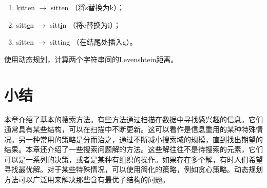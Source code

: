 \documentclass[UTF8]{article}
\begin{document}
\begin{Exercise}
\begin{itemize}
  \begin{enumerate}
  \item \underline{k}itten $\rightarrow$ \underline{s}itten （将s替换为k）；
  \item sitt\underline{e}n $\rightarrow$ sitt\underline{i}n （将e替换为i）；
  \item sitten $\rightarrow$ sittin\underline{g} （在结尾处插入g）。
  \end{enumerate}
使用动态规划，计算两个字符串间的Levenshtein距离。
\end{itemize}
\end{Exercise}

\section{小结}

本章介绍了基本的搜索方法。有些方法通过扫描在数据中寻找感兴趣的信息。它们通常具有某些结构，可以在扫描中不断更新。这可以看作是信息重用的某种特殊情况。另一种常用的策略是分而治之，通过不断减小搜索域的规模，直到找出期望的结果。本章还介绍了一些搜索问题解的方法。这些解往往不是待搜索的元素，它们可以是一系列的决策，或者是某种有组织的操作。如果存在多个解，有时人们希望寻找最优解。对于某些特殊情况，可以使用简化的策略，例如贪心策略。动态规划方法可以广泛用来解决那些含有最优子结构的问题。
\end{document}
